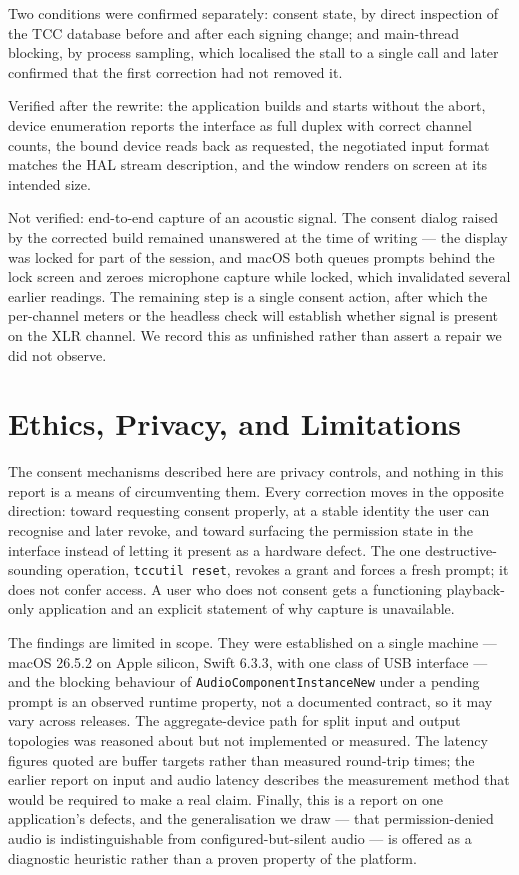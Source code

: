\documentclass[10pt,letterpaper,twocolumn]{article}
\newcommand{\code}[1]{\texttt{#1}}
\begin{document}
Two conditions were confirmed separately: consent state, by direct inspection of the TCC database before and after each signing change; and main-thread blocking, by process sampling, which localised the stall to a single call and later confirmed that the first correction had not removed it.

Verified after the rewrite: the application builds and starts without the abort, device enumeration reports the interface as full duplex with correct channel counts, the bound device reads back as requested, the negotiated input format matches the HAL stream description, and the window renders on screen at its intended size.

Not verified: end-to-end capture of an acoustic signal. The consent dialog raised by the corrected build remained unanswered at the time of writing --- the display was locked for part of the session, and macOS both queues prompts behind the lock screen and zeroes microphone capture while locked, which invalidated several earlier readings. The remaining step is a single consent action, after which the per-channel meters or the headless check will establish whether signal is present on the XLR channel. We record this as unfinished rather than assert a repair we did not observe.

\section{Ethics, Privacy, and Limitations}

The consent mechanisms described here are privacy controls, and nothing in this report is a means of circumventing them. Every correction moves in the opposite direction: toward requesting consent properly, at a stable identity the user can recognise and later revoke, and toward surfacing the permission state in the interface instead of letting it present as a hardware defect. The one destructive-sounding operation, \code{tccutil reset}, revokes a grant and forces a fresh prompt; it does not confer access. A user who does not consent gets a functioning playback-only application and an explicit statement of why capture is unavailable.

The findings are limited in scope. They were established on a single machine --- macOS 26.5.2 on Apple silicon, Swift 6.3.3, with one class of USB interface --- and the blocking behaviour of \code{AudioComponent\allowbreak Instance\allowbreak New} under a pending prompt is an observed runtime property, not a documented contract, so it may vary across releases. The aggregate-device path for split input and output topologies was reasoned about but not implemented or measured. The latency figures quoted are buffer targets rather than measured round-trip times; the earlier report on input and audio latency \cite{scudderLatency} describes the measurement method that would be required to make a real claim. Finally, this is a report on one application's defects, and the generalisation we draw --- that permission-denied audio is indistinguishable from configured-but-silent audio --- is offered as a diagnostic heuristic rather than a proven property of the platform.
\end{document}
